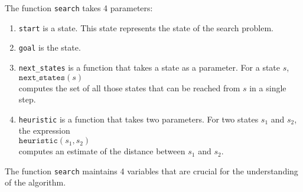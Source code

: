 The function \texttt{search} takes 4 parameters:
\begin{enumerate}
\item \texttt{start} is a state.  This state represents the  state of the search problem.
\item \texttt{goal} is the  state.
\item \texttt{next\_states} is a function that takes a state as a parameter.  For a state $s$,
      \\[0.2cm]
      \hspace*{1.3cm}
      $\mathtt{next\_states}(s)$
      \\[0.2cm]
      computes the set of all those states that can be reached from $s$ in a single step.
\item \texttt{heuristic} is a function that takes two parameters.
      For two states $s_1$ and $s_2$, the expression
      \\[0.2cm]
      \hspace*{1.3cm}
      $\texttt{heuristic}(s_1, s_2)$
      \\[0.2cm]
      computes an estimate of the distance between $s_1$ and $s_2$.
\end{enumerate}
The function \texttt{search} maintains 4 variables that are crucial for the understanding of the
algorithm.
